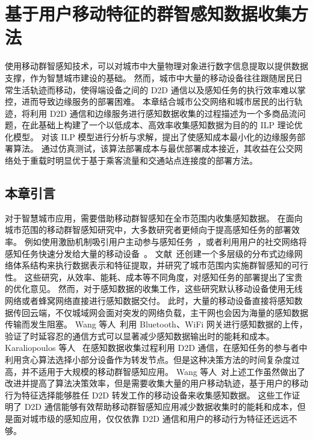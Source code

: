 \chapter{基于用户移动特征的群智感知数据收集方法}

使用移动群智感知技术，可以对城市中大量物理对象进行数字信息提取以提供数据支撑，作为智慧城市建设的基础。
然而，城市中大量的移动设备往往跟随居民日常生活轨迹而移动，使得端设备之间的 D2D 通信以及感知任务的执行效率难以掌控，进而导致边缘服务的部署困难。
本章结合城市公交网络和城市居民的出行轨迹，将利用 D2D 通信和边缘服务进行感知数据收集的过程描述为一个多商品流问题，在此基础上构建了一个以低成本、高效率收集感知数据为目的的 ILP 理论优化模型。
对该 ILP 模型进行分析与求解，提出了使感知成本最小化的边缘服务部署算法。
通过仿真测试，该算法部署成本与最优部署成本接近，其收益在公交网络处于重载时明显优于基于乘客流量和交通站点连接度的部署方法。

\section{本章引言}

对于智慧城市应用，需要借助移动群智感知在全市范围内收集感知数据。
在面向城市范围的移动群智感知研究中，大多数研究者更倾向于提高感知任务的部署效率。
例如使用激励机制吸引用户主动参与感知任务~\cite{CNKI:JiaChaopeng, CNKI:WuMCSIncentive, jiyubianyuanjisuangongyecaiji}，或者利用用户的社交网络将感知任务快速分发给大量的移动设备~\cite{Cnki:Yu2018}。
文献~还创建一个多层级的分布式边缘网络体系结构来执行数据表示和特征提取，并研究了城市范围内实施群智感知的可行性。
这些研究，从效率、能耗、成本等不同角度，对感知任务的部署提出了宝贵的优化意见。
然而，对于感知数据的收集工作，这些研究默认移动设备使用无线网络或者蜂窝网络直接进行感知数据交付。
此时，大量的移动设备直接将感知数据传回云端，不仅城域网会面对突发的网络负载，主干网也会因为海量的感知数据传输而发生阻塞。
Wang 等人~\cite{DBLP:conf/huc/WangZX13}利用 Bluetooth、WiFi 网关进行感知数据的上传，验证了时延容忍的通信方式可以显著减少感知数据输出时的能耗和成本。
Karaliopoulos 等人~\cite{DBLP:conf/infocom/KaraliopoulosTK15} 在感知数据收集过程利用 D2D 通信，在感知任务的参与者中利用贪心算法选择小部分设备作为转发节点。但是这种决策方法的时间复杂度过高，并不适用于大规模的移动群智感知应用。
Wang 等人~\cite{DBLP:journals/puc/WangLL17}对上述工作虽然做出了改进并提高了算法决策效率，但是需要收集大量的用户移动轨迹，基于用户的移动行为特征选择能够胜任 D2D 转发工作的移动设备来收集感知数据。
这些工作证明了 D2D 通信能够有效帮助移动群智感知应用减少数据收集时的能耗和成本，但是面对城市级的感知应用，仅仅依靠 D2D 通信和用户的移动行为特征还远远不够。

